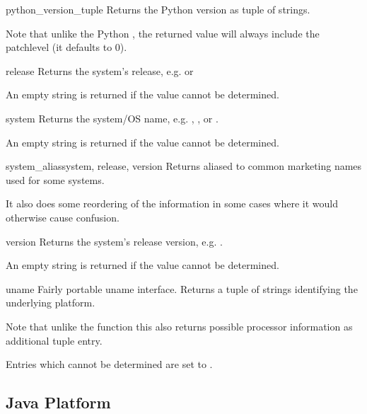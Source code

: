\begin{funcdesc}{python_version_tuple}{}
  Returns the Python version as tuple 
  of strings.

  Note that unlike the Python , the returned value
  will always include the patchlevel (it defaults to 0).
\end{funcdesc}

\begin{funcdesc}{release}{}
  Returns the system's release, e.g.  or 

  An empty string is returned if the value cannot be determined.
\end{funcdesc}

\begin{funcdesc}{system}{}
  Returns the system/OS name, e.g. , , or .

  An empty string is returned if the value cannot be determined.
\end{funcdesc}

\begin{funcdesc}{system_alias}{system, release, version}
  Returns  aliased to common
  marketing names used for some systems.

  It also does some reordering of the information in some cases
  where it would otherwise cause confusion.
\end{funcdesc}

\begin{funcdesc}{version}{}
  Returns the system's release version, e.g. .

  An empty string is returned if the value cannot be determined.
\end{funcdesc}

\begin{funcdesc}{uname}{}
  Fairly portable uname interface. Returns a tuple
  of strings 
  identifying the underlying platform.

  Note that unlike the  function this also returns
  possible processor information as additional tuple entry.

  Entries which cannot be determined are set to .
\end{funcdesc}

\subsection{Java Platform}

